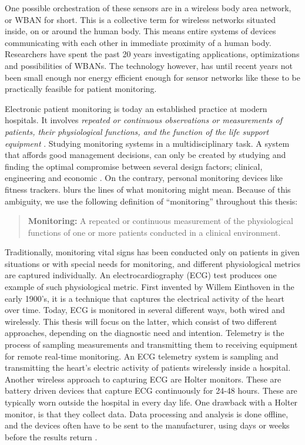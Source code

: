 One possible orchestration of these sensors are in a wireless body area network, or WBAN for short. This is a collective term for wireless networks situated inside, on or around the human body. This means entire systems of devices communicating with each other in immediate proximity of a human body. Researchers have spent the past 20 years investigating applications, optimizations and possibilities of WBANs. The technology however, has until recent years not been small enough nor energy efficient enough for sensor networks like these to be practically feasible for patient monitoring.

Electronic patient monitoring is today an established practice at modern hospitals. It involves \textit{repeated or continuous observations or measurements of patients, their physiological functions, and the function of the life support equipment} \cite{PMID:10315668}. Studying monitoring systems in a multidisciplinary task. A system that affords good management decisions, can only be created by studying and finding the optimal compromise between several design factors; clinical, engineering and economic \cite{Anonymous:yOjY0N0Y}. On the contrary, personal monitoring devices like fitness trackers. blurs the lines of what monitoring might mean. Because of this ambiguity, we use the following definition of ``monitoring'' throughout this thesis: 

\begin{quote}
\textbf{Monitoring:} A repeated or continuous measurement of the physiological functions of one or more patients conducted in a clinical environment.
\end{quote}

\noindent Traditionally, monitoring vital signs has been conducted only on patients in given situations or with special needs for monitoring, and different physiological metrics are captured individually. An electrocardiography (ECG) test produces one example of such physiological metric. First invented by Willem Einthoven in the early 1900's, it is a technique that captures the electrical activity of the heart over time. Today, ECG is monitored in several different ways, both wired and wirelessly. This thesis will focus on the latter, which consist of two different approaches, depending on the diagnostic need and intention. Telemetry is the process of sampling measurements and transmitting them to receiving equipment for remote real-time monitoring. An ECG telemetry system is sampling and transmitting the heart's electric activity of patients wirelessly inside a hospital. Another wireless approach to capturing ECG are Holter monitors. These are battery driven devices that capture ECG continuously for 24-48 hours. These are typically worn outside the hospital in every day life. One drawback with a Holter monitor, is that they collect data. Data processing and analysis is done offline, and the devices often have to be sent to the manufacturer, using days or weeks before the results return \cite{ziopatch:14}.

